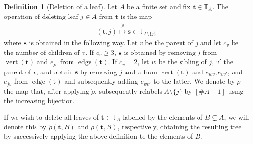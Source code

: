 \documentclass[a4paper, final]{amsart}
\theoremstyle{plain}
\theoremstyle{definition}
\newtheorem{defi}[thm]{Definition}
\newcommand{\tree}[1][t]{\boldsymbol{#1}}
\newcommand{\T}{\mathbb{T}}
\DeclareMathOperator{\edge}{edge}
\DeclareMathOperator{\vertices}{vert}
\DeclareMathOperator{\branchpoints}{bp}
\begin{document}
%
%
\begin{defi}[Deletion of a leaf]
  \label{def:leaf_deletion}
  Let $A$ be a finite set and fix $\tree \in \T_A$.
  The operation of deleting leaf $j \in A$ from $\tree$ is the map
  \begin{align*}
    \left( \tree, j \right) \overset{\mathring{\rho}}{\mapsto} \tree[s] \in \T_{A \setminus \{j\}}
  \end{align*}
  where $\tree[s]$ is obtained in the following way.
  Let $v$ be the parent of $j$ and let $c_v$ be the number of children of $v$.
  If $c_v \geq 3$, $\tree[s]$ is obtained by removing $j$ from $\vertices ( \tree )$ and $e_{jv}$ from $\edge (\tree)$.
  If $c_v = 2$, let $w$ be the sibling of $j$, $v'$ the parent of $v$, and obtain $\tree[s]$ by removing $j$ and $v$ from $\vertices (\tree)$ and $e_{wv}, e_{vv'}$, and $e_{jv}$ from $\edge (\tree)$ and subsequently adding $e_{wv'}$ to the latter.
  We denote by $\rho$ the map that, after applying $\mathring{\rho}$, subsequently relabels $A \setminus \{j\}$ by $[\# A - 1]$ using the increasing bijection.
\end{defi}
%
If we wish to delete all leaves of $\tree \in \T_A$ labelled by the elements of $B \subsetneq A$, we will denote this by $\mathring{\rho} (\tree, B)$ and $\rho (\tree, B)$, respectively, obtaining the resulting tree by successively applying the above definition to the elements of $B$.
\end{document}
